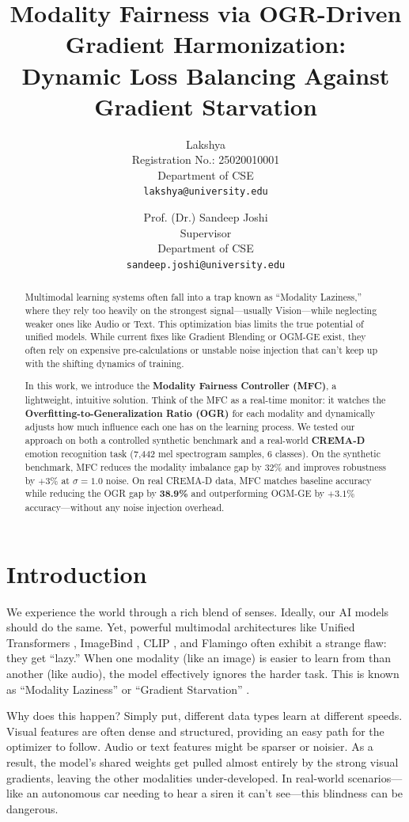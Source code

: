 \documentclass[10pt, twocolumn, letterpaper]{article}
\title{\textbf{Modality Fairness via OGR-Driven Gradient Harmonization: \\ Dynamic Loss Balancing Against Gradient Starvation}}
\author{
Lakshya \\
Registration No.: 25020010001 \\
Department of CSE \\
{\tt\small lakshya@university.edu}
\and
Prof. (Dr.) Sandeep Joshi \\
Supervisor \\
Department of CSE \\
{\tt\small sandeep.joshi@university.edu}
}
\begin{document}
\maketitle

\begin{abstract}
Multimodal learning systems often fall into a trap known as ``Modality Laziness,'' where they rely too heavily on the strongest signal—usually Vision—while neglecting weaker ones like Audio or Text. This optimization bias limits the true potential of unified models. While current fixes like Gradient Blending or OGM-GE exist, they often rely on expensive pre-calculations or unstable noise injection that can't keep up with the shifting dynamics of training.

In this work, we introduce the \textbf{Modality Fairness Controller (MFC)}, a lightweight, intuitive solution. Think of the MFC as a real-time monitor: it watches the \textbf{Overfitting-to-Generalization Ratio (OGR)} for each modality and dynamically adjusts how much influence each one has on the learning process. We tested our approach on both a controlled synthetic benchmark and a real-world \textbf{CREMA-D} emotion recognition task (7,442 mel spectrogram samples, 6 classes). On the synthetic benchmark, MFC reduces the modality imbalance gap by 32\% and improves robustness by $+3\%$ at $\sigma{=}1.0$ noise. On real CREMA-D data, MFC matches baseline accuracy while reducing the OGR gap by \textbf{38.9\%} and outperforming OGM-GE by $+3.1\%$ accuracy—without any noise injection overhead.
\end{abstract}

\section{Introduction}
We experience the world through a rich blend of senses. Ideally, our AI models should do the same. Yet, powerful multimodal architectures like Unified Transformers \cite{meta_transformer}, ImageBind \cite{imagebind}, CLIP \cite{clip}, and Flamingo \cite{flamingo} often exhibit a strange flaw: they get ``lazy.'' When one modality (like an image) is easier to learn from than another (like audio), the model effectively ignores the harder task. This is known as ``Modality Laziness'' or ``Gradient Starvation'' \cite{gradient_starvation}.

Why does this happen? Simply put, different data types learn at different speeds. Visual features are often dense and structured, providing an easy path for the optimizer to follow. Audio or text features might be sparser or noisier. As a result, the model's shared weights get pulled almost entirely by the strong visual gradients, leaving the other modalities under-developed. In real-world scenarios—like an autonomous car needing to hear a siren it can't see—this blindness can be dangerous.
\end{document}
